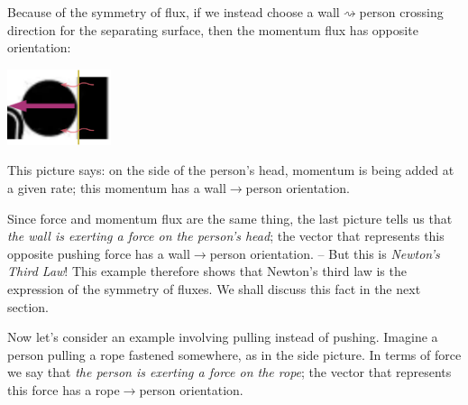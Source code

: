 \documentclass[a4paper,12pt,%
onecolumn,oneside,%
british%
]{memoir}
\renewcommand*{\|}[1][]{\nonscript\:#1\vert\nonscript\:\mathopen{}}
\begin{document}
Because of the symmetry of flux, if we instead choose a wall$\rightsquigarrow$person crossing direction for the separating surface, then the momentum flux has opposite orientation:\noprelistbreak
\begin{center}
  \includegraphics[height=6em]{images/person_push_flux_left.pdf}
\end{center}
This picture says: on the side of the person's head, momentum is being added at a given rate; this momentum has a wall$\rightarrow$person orientation.

Since force and momentum flux are the same thing, the last picture tells us that \emph{the wall is exerting a force on the person's head}; the vector that represents this opposite pushing force has a wall$\to$person orientation. -- But this is \emph{Newton's Third Law}! This example therefore shows that Newton's third law is the expression of the symmetry of fluxes. We shall discuss this fact in the next section.

\medskip

Now let's consider an example involving pulling instead of pushing. Imagine a person pulling a rope fastened somewhere, as in the side picture. In terms of force we say that \emph{the person is exerting a force on the rope}; the vector that represents this force has a rope$\rightarrow$person orientation.
%
%
\end{document}
